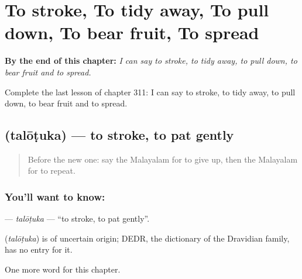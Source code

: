 
\chapter{To stroke, To tidy away, To pull down, To bear fruit, To spread}
\label{ch:ml-to-stroke-to-tidy-away-to-pull-down-to-bear-fruit-to-spread}

\begin{chapteropening}
\textbf{By the end of this chapter:} \emph{I can say to stroke, to tidy away, to pull down, to bear fruit and to spread.}

Complete the last lesson of chapter 311: I can say to stroke, to tidy away, to pull down, to bear fruit and to spread.
\end{chapteropening}

\section[\texorpdfstring{\ml{തലോടുക} (talōṭuka)}{തലോടുക (talōṭuka)}]{ (talōṭuka) — to stroke, to pat gently}

\label{lesson:ML-C311-talotuka}



\begin{quote}
Before the new one: say the Malayalam for to give up, then the Malayalam for to repeat.
\end{quote}

\subsection*{You'll want to know: }
\textbf{} — \emph{talōṭuka} — \textquotedblleft{}to stroke, to pat gently\textquotedblright{}.

\begin{cousinweb}
\textbf{} (\emph{talōṭuka}) is of uncertain origin; DEDR, the dictionary of the Dravidian family, has no entry for it.
\end{cousinweb}

\begin{grammarlens}[title={What you've built}]
One more word for this chapter.
\end{grammarlens}

